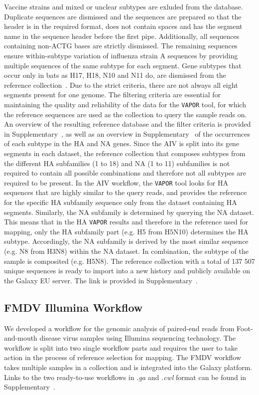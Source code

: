 Vaccine strains and mixed or unclear subtypes are exluded from the database. Duplicate sequences are dismissed and the sequences are prepared so that the header is in the required format, does not contain spaces and has the segment name in the sequence header before the first pipe. Additionally, all sequences containing non-ACTG bases are strictly dismissed. The remaining sequences ensure within-subtype variation of influenza strain A sequences by providing multiple sequences of the same subtype for each segment. Gene subtypes that occur only in bats as H17, H18, N10 and N11 do, are dismissed from the reference collection~\cite{tong2013new}. Due to the strict criteria, there are not always all eight segments present for one genome. The filtering criteria are essential for maintaining the quality and reliability of the data for the \texttt{VAPOR} tool, for which the reference sequences are used as the collection to query the sample reads on. An overview of the resulting reference database and the filter criteria is provided in Supplementary~, as well as an overview in Supplementary~ of the occurrences of each subtype in the \ac{HA} and \ac{NA} genes. Since the \ac{AIV} is split into its gene segments in each dataset, the reference collection that composes subtypes from the different \ac{HA} subfamilies (1 to 18) and \ac{NA} (1 to 11) subfamilies is not required to contain all possible combinations and therefore not all subtypes are required to be present. In the \ac{AIV} workflow, the \texttt{VAPOR} tool looks for \ac{HA} sequences that are highly similar to the query reads, and provides the reference for the specific \ac{HA} subfamily sequence only from the dataset containing \ac{HA} segments. Similarly, the \ac{NA} subfamily is determined by querying the \ac{NA} dataset. This means that in the \ac{HA} \texttt{VAPOR} results and therefore in the reference used for mapping, only the \ac{HA} subfamily part (e.g. H5 from H5N10) determines the \ac{HA} subtype. Accordingly, the \ac{NA} subfamily is derived by the most similar sequence (e.g. N8 from H3N8) within the \ac{NA} dataset. In combination, the subtype of the sample is composited (e.g. H5N8).
The reference collection with a total of 137 507 unique sequences is ready to import into a new history and publicly available on the Galaxy EU server. The link is provided in Supplementary~. 

\subsection{FMDV Illumina Workflow}\label{sec:fmdv-wf}
We developed a workflow for the genomic analysis of paired-end reads from Foot-and-mouth disease virus samples using Illumina sequencing technology. The workflow is split into two single workflow parts and requires the user to take action in the process of reference selection for mapping. The \ac{FMDV} workflow takes multiple samples in a collection and is integrated into the Galaxy platform. Links to the two ready-to-use workflows in \textit{.ga} and \textit{.cwl} format can be found in Supplementary~.\\

